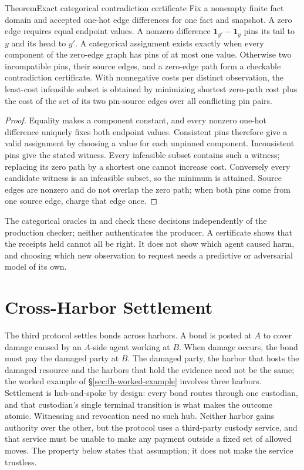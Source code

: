 \documentclass[11pt,a4paper]{article}
\theoremstyle{definition}
\theoremstyle{remark}
\begin{document}
\begin{pdclaim}{Theorem}{Exact categorical contradiction certificate}
\label{thm:categorical-certificate}
Fix a nonempty finite fact domain and accepted one-hot edge differences for
one fact and snapshot. A zero edge requires equal endpoint values. A nonzero
difference $\mathbf{1}_{y'}-\mathbf{1}_{y}$ pins its tail to $y$ and its head to $y'$. A categorical
assignment exists exactly when every component of the zero-edge graph has
pins of at most one value. Otherwise two incompatible pins, their source
edges, and a zero-edge path form a checkable contradiction certificate.
With nonnegative costs per distinct observation, the least-cost infeasible
subset is obtained by minimizing shortest zero-path cost plus the cost of the
set of its two pin-source edges over all conflicting pin pairs.
\end{pdclaim}
\begin{proof}
Equality makes a component constant, and every nonzero one-hot difference
uniquely fixes both endpoint values. Consistent pins therefore give a valid
assignment by choosing a value for each unpinned component. Inconsistent pins
give the stated witness. Every infeasible subset contains such a witness;
replacing its zero path by a shortest one cannot increase cost. Conversely
every candidate witness is an infeasible subset, so the minimum is attained.
Source edges are nonzero and do not overlap the zero path; when both pins
come from one source edge, charge that edge once.
\end{proof}

The categorical oracles in  and
 check these decisions
independently of the production checker; neither authenticates the producer.
A certificate shows that the receipts held cannot all be right. It does not
show which agent caused harm, and choosing which new observation to request
needs a predictive or adversarial model of its own.


\section{Cross-Harbor Settlement}\label{sec:fh-settlement}

The third protocol settles bonds across harbors. A bond is posted at $A$ to
cover damage caused by an $A$-side agent working at $B$. When damage occurs,
the bond must pay the damaged party at $B$. The damaged party, the harbor that
hosts the damaged resource and the harbors that hold the evidence need not be
the same; the worked example of \S\ref{sec:fh-worked-example} involves three
harbors. Settlement is hub-and-spoke by design: every bond routes through one
custodian, and that custodian's single terminal transition is what makes the
outcome atomic. Witnessing and revocation need no such hub. Neither harbor gains authority over
the other, but the protocol uses a third-party custody service, and that
service must be unable to make any payment outside a fixed set of allowed
moves. The property below states that assumption; it does not make the
service trustless.
\end{document}

